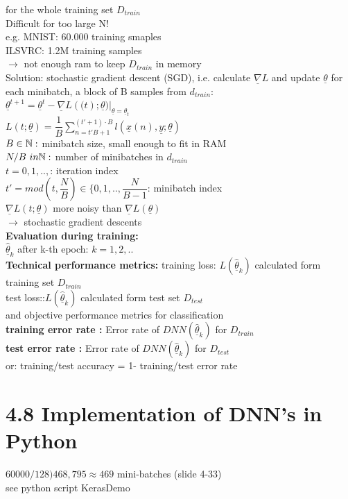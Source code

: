 for the whole training set $ D_{train} $ \\
Difficult for too large N!\\
e.g. MNIST: 60.000 training smaples \\
ILSVRC: 1.2M training samples \\
$\rightarrow$ not enough ram to keep $ D_{train} $ in memory \\
Solution: stochastic gradient descent (SGD), i.e. calculate $ \underline{\nabla}L $ and update $ \underline{\theta} $ for each minibatch, a block of B samples from $ d_{train} $: \\
$ \underline{\theta}^{t+1} = \underline{\theta}^t - \underline{\nabla}L (\mathbf(t); \underline{\theta})|_{\underline{\theta} = \underline{\theta}_t} $\\
$ L(t; \underline{\theta}) =  \dfrac{1}{B} \sum_{n=t'B+1}^{(t' +1) \cdot B} l (\underline{x}(n), \underline{y} ; \underline{\theta})$ \\
$  B \in \mathbb N: $ minibatch size, small enough to fit in RAM \\
$ N/B \ in \mathbb N:  $ number of minibatches in $ d_{train} $ \\
$  t = 0,1 ,..,  $: iteration index \\
$  t' = mod(t, \dfrac{N}{B}) \in \lbrace 0,1,.., \dfrac{N}{B-1} $: minibatch index \\
$  \underline{\nabla } L (t; \underline{\theta}) $ more noisy than $\underline{\nabla} L (\underline{\theta} )$\\
$\rightarrow$ stochastic gradient descents \\
\textbf{Evaluation during training:} \\
$  \hat{ \underline{\theta}}_k  $ after k-th epoch: $  k = 1,2,.. $ \\
\textbf{Technical performance metrics:}
\textbullet training loss: $  L(\hat{\underline{\theta}}_k) $ calculated form training set $ D_{train} $\\
\textbullet test loss::$ L(\hat{\underline{\theta}}_k) $ calculated form test set $ D_{test} $\\
and objective performance metrics for classification \\
\textbullet \textbf{training error rate :} Error rate of $ DNN( \hat{\underline{\theta}}_k) $ for $ D_{train} $\\
\textbullet \textbf{test error rate :} Error rate of $ DNN( \hat{\underline{\theta}}_k) $ for $ D_{test} $\\
or:
\textbullet training/test accuracy =   1- training/test error rate 
\section{4.8 Implementation of DNN's in Python}
\textbullet $ 60000/ 128 ) 468,795 \approx 469 $ mini-batches (slide 4-33)\\
\textbullet see python script KerasDemo